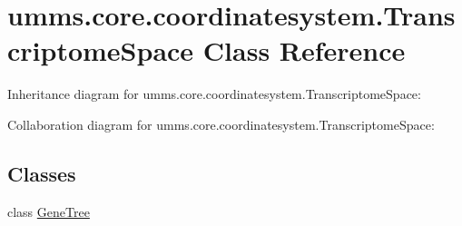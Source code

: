 \hypertarget{classumms_1_1core_1_1coordinatesystem_1_1_transcriptome_space}{\section{umms.\+core.\+coordinatesystem.\+Transcriptome\+Space Class Reference}
\label{classumms_1_1core_1_1coordinatesystem_1_1_transcriptome_space}
}


Inheritance diagram for umms.\+core.\+coordinatesystem.\+Transcriptome\+Space\+:


Collaboration diagram for umms.\+core.\+coordinatesystem.\+Transcriptome\+Space\+:
\subsection*{Classes}
\begin{DoxyCompactItemize}
\item 
class \hyperlink{classumms_1_1core_1_1coordinatesystem_1_1_transcriptome_space_1_1_gene_tree}{Gene\+Tree}
\end{DoxyCompactItemize}
